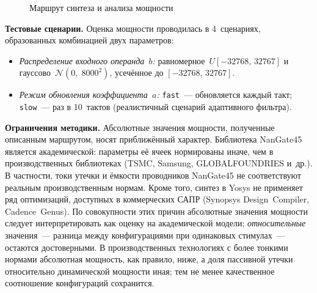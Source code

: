 \documentclass[a4paper, 12pt, oneside]{report}
\begin{document}
\begin{figure}[H]
  \centering
  \caption{Маршрут синтеза и анализа мощности}
  \label{fig:flow}
\end{figure}

\textbf{Тестовые сценарии.} Оценка мощности проводилась в 4~сценариях,
образованных комбинацией двух параметров:
\begin{itemize}
  \item \textit{Распределение входного операнда~$b$:}
        равномерное~$U{[-32768,\,32767]}$ и
        гауссово~$\mathcal{N}(0,\;8000^2)$, усечённое до
        $[-32768,\,32767]$.
  \item \textit{Режим обновления коэффициента~$a$:}
        \texttt{fast}~--- обновляется каждый такт;
        \texttt{slow}~--- раз в 10~тактов (реалистичный сценарий
        адаптивного фильтра).
\end{itemize}

\textbf{Ограничения методики.} Абсолютные значения мощности,
полученные описанным маршрутом, носят приближённый характер.
Библиотека NanGate45 является академической: параметры её ячеек
нормированы иначе, чем в производственных библиотеках (TSMC, Samsung,
GLOBALFOUNDRIES и~др.). В частности, токи утечки и ёмкости
проводников NanGate45 не соответствуют реальным производственным
нормам. Кроме того, синтез в Yosys не применяет ряд оптимизаций,
доступных в коммерческих САПР (Synopsys Design~Compiler,
Cadence~Genus). По совокупности этих причин абсолютные значения
мощности следует интерпретировать как оценку на академической модели;
\textit{относительные} значения~--- разница между конфигурациями при
одинаковых стимулах~--- остаются достоверными. В производственных
технологиях с более тонкими нормами абсолютная мощность, как правило,
ниже, а доля пассивной утечки относительно динамической мощности
иная; тем не менее качественное соотношение конфигураций сохранится.
\end{document}
